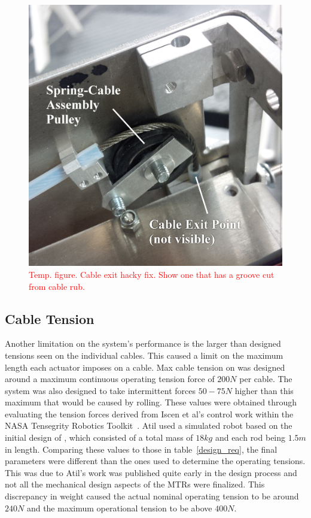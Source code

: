 \begin{appendices}
\begin{figure}[thpb]
      \centering
      \includegraphics[width=0.6\columnwidth]{tex/img/cable_pulley_bearing_labelled_fixedfonts}
      \caption{\textcolor{red}{Temp. figure. Cable exit hacky fix. Show one that has a groove cut from cable rub.}}
      \label{fig:cable_output}
\end{figure}

\subsection{Cable Tension}
\label{sec:cable_tension}
Another limitation on the system's performance is the larger than designed tensions seen on the individual cables.
This caused a limit on the maximum length each actuator imposes on a cable. 
Max cable tension on \SB{} was designed around a maximum continuous operating tension force of \(200N\) per cable.
The system was also designed to take intermittent forces \(50-75N\) higher than this maximum that would be caused by rolling.
These values were obtained through evaluating the tension forces derived from Iscen et al's control work within the NASA Tensegrity Robotics Toolkit~\cite{iscen2014flop}.
Atil used a simulated robot based on the initial design of \SB{}, which consisted of a total mass of \(18kg\) and each rod being \(1.5m\) in length. 
Comparing these values to those in table~\ref{design_req}, the final \SB{} parameters were different than the ones used to determine the operating tensions.
This was due to Atil's work was published quite early in the design process and not all the mechanical design aspects of the MTRs were finalized.
This discrepancy in weight caused the actual nominal operating tension to be around \(240N\) and the maximum operational tension to be above \(400N\).


\end{appendices}
